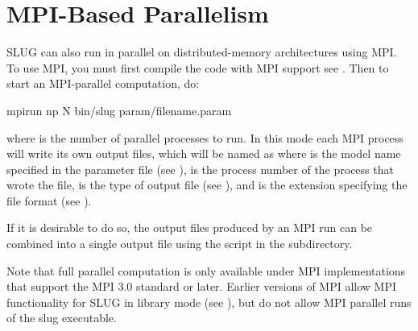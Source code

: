 \documentclass[letterpaper,10pt,english]{sphinxmanual}
\begin{document}
\section{MPI-Based Parallelism}
\label{\detokenize{running:mpi-based-parallelism}}
SLUG can also run in parallel on distributed-memory architectures using MPI. To use MPI, you must first compile the code with MPI support \textendash{} see {\hyperref[\detokenize{compiling:ssec-compiling}]{}}. Then to start an MPI-parallel computation, do:

\begin{sphinxVerbatim}[commandchars=\\\{\}]
mpirun \PYGZhy{}np N bin/slug param/filename.param
\end{sphinxVerbatim}

where  is the number of parallel processes to run. In this mode each MPI process will write its own output files, which will be named as  where  is the model name specified in the parameter file (see {\hyperref[\detokenize{parameters:sec-parameters}]{}}),  is the process number of the process that wrote the file,  is the type of output file (see {\hyperref[\detokenize{output:sec-output}]{}}), and  is the extension specifying the file format (see {\hyperref[\detokenize{output:sec-output}]{}}).

If it is desirable to do so, the output files produced by an MPI run can be combined into a single output file using the  script in the  subdirectory.

Note that full parallel computation is only available under MPI implementations that support the MPI 3.0 standard or later. Earlier versions of MPI allow MPI functionality for SLUG in library mode (see {\hyperref[\detokenize{library:sec-library-mode}]{}}), but do not allow MPI parallel runs of the slug executable.
\end{document}
